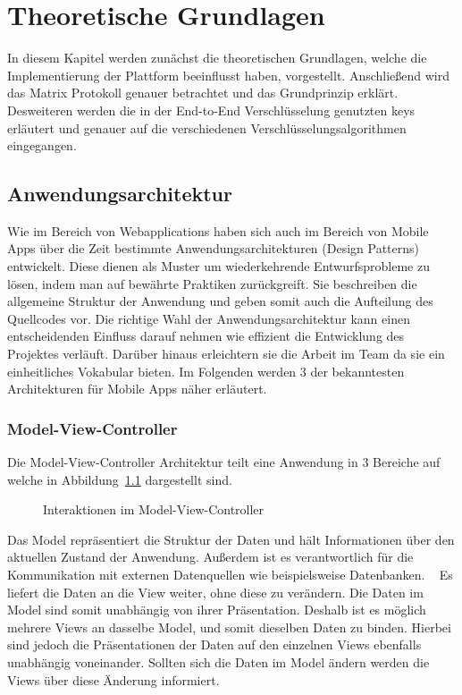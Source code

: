     \newpage
    \chapter{Theoretische Grundlagen}\label{ch:theoretische-grundlagen}
    In diesem Kapitel werden zunächst die theoretischen Grundlagen, welche die Implementierung der Plattform beeinflusst haben, vorgestellt.
    Anschließend wird das Matrix Protokoll genauer betrachtet und das Grundprinzip erklärt.
    Desweiteren werden die in der End-to-End Verschlüsselung genutzten keys erläutert und genauer auf die verschiedenen Verschlüsselungsalgorithmen eingegangen.

    \section{Anwendungsarchitektur}\label{sec:anwendungsarchitektur}
    Wie im Bereich von Webapplications haben sich auch im Bereich von Mobile Apps über die Zeit bestimmte Anwendungsarchitekturen (Design Patterns) entwickelt.
    Diese dienen als Muster um wiederkehrende Entwurfsprobleme zu lösen, indem man auf bewährte Praktiken zurückgreift.
    Sie beschreiben die allgemeine Struktur der Anwendung und geben somit auch die Aufteilung des Quellcodes vor.
    Die richtige Wahl der Anwendungsarchitektur kann einen entscheidenden Einfluss darauf nehmen wie effizient die Entwicklung des Projektes verläuft.
    Darüber hinaus erleichtern sie die Arbeit im Team da sie ein einheitliches Vokabular bieten.
    Im Folgenden werden 3 der bekanntesten Architekturen für Mobile Apps näher erläutert.

    \subsection{Model-View-Controller}\label{subsec:model-view-controller}
    Die Model-View-Controller Architektur teilt eine Anwendung in 3 Bereiche auf welche in Abbildung~\ref{fig:mvc} dargestellt sind.

    \begin{figure}
        \centering
        
        \caption{Interaktionen im Model-View-Controller}
        \label{fig:mvc}
    \end{figure}

    Das Model repräsentiert die Struktur der Daten und hält Informationen über den aktuellen Zustand der Anwendung.
    Außerdem ist es verantwortlich für die Kommunikation mit externen Datenquellen wie beispielsweise Datenbanken.
    ~\cite{mvc}
    Es liefert die Daten an die View weiter, ohne diese zu verändern.
    Die Daten im Model sind somit unabhängig von ihrer Präsentation.
    Deshalb ist es möglich mehrere Views an dasselbe Model, und somit dieselben Daten zu binden.
    Hierbei sind jedoch die Präsentationen der Daten auf den einzelnen Views ebenfalls unabhängig voneinander.
    Sollten sich die Daten im Model ändern werden die Views über diese Änderung informiert.
    ~\cite{https://doi.org/10.48550/arxiv.1408.5786}

